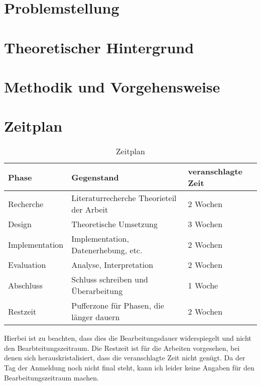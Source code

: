 \documentclass[
	12pt,
	a4paper,
	BCOR10mm,
	DIV14,
	listof=totoc,
	bibliography=totoc,
	headsepline
]{scrreprt}
\begin{document}
\chapter{Problemstellung}
\label{Problemstellung}


\chapter{Theoretischer Hintergrund}
\label{Theoretischer Hintergrund}

\chapter{Methodik und Vorgehensweise}
\label{Methodik und Vorgehensweise}

\chapter{Zeitplan}
\label{Zeitplan}
\begin{table}[h]
\begin{center}
\begin{tabular} {|l|p{4cm}|l|}
	\hline
	\textbf{Phase} & \textbf{Gegenstand} & \textbf{veranschlagte Zeit} \\ \hline
	Recherche & Literaturrecherche \newline Theorieteil der Arbeit & 2 Wochen \\ \hline
	Design & Theoretische Umsetzung & 3 Wochen \\ \hline
	Implementation & Implementation, \newline Datenerhebung, etc. & 2 Wochen \\ \hline
	Evaluation & Analyse, \newline Interpretation & 2 Wochen \\ \hline
	Abschluss & Schluss schreiben und Überarbeitung & 1 Woche \\ \hline
	Restzeit & Pufferzone für Phasen, die länger dauern & 2 Wochen \\ \hline
\end{tabular}
\end{center}
\caption{Zeitplan}
\label{tab:timeplan}
\end{table}
Hierbei ist zu beachten, dass dies die Bearbeitungsdauer widerspiegelt und nicht den Bearbteitungszeitraum.
Die Restzeit ist für die Arbeiten vorgesehen, bei denen sich herauskristalisiert, dass die veranschlagte Zeit nicht genügt.
Da der Tag der Anmeldung noch nicht final steht, kann ich leider keine Angaben für den Bearbeitungszeitraum machen.





\nocite{*}




\end{document}
